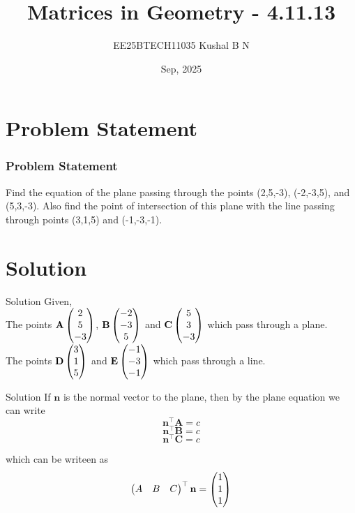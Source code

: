 \documentclass[notheorems]{beamer}
\title{Matrices in Geometry - 4.11.13}
\author{EE25BTECH11035  Kushal B N}
\date{Sep, 2025}
\let\vec\mathbf
\theoremstyle{remark}
\begin{document}
\maketitle

\section{Problem Statement}
\begin{frame}
\frametitle{Problem Statement}
Find the equation of the plane passing through the points (2,5,-3), (-2,-3,5), and (5,3,-3). Also find the point of intersection of this plane with the line passing through points (3,1,5) and (-1,-3,-1).
\end{frame}

\section{Solution}
\begin{frame}{Solution}
Given,\\
The points $\vec{A}\myvec{2\\5\\-3}$, $\vec{B}\myvec{-2\\-3\\5}$ and $\vec{C}\myvec{5\\3\\-3}$ which pass through a plane.\\
The points $\vec{D}\myvec{3\\1\\5}$ and $\vec{E}\myvec{-1\\-3\\-1}$ which pass through a line.
\end{frame}

\begin{frame}{Solution}
If $\vec{n}$ is the normal vector to the plane, then by the plane equation we can write\\
\begin{equation}
    \vec{n}^{\top}\vec{A} = c
\end{equation}
\begin{equation}
    \vec{n}^{\top}\vec{B} = c
\end{equation}
\begin{equation}
    \vec{n}^{\top}\vec{C} = c
\end{equation}

which can be writeen as
\begin{equation}
    \myvec{A&B&C}^{\top}\vec{n} = \myvec{1\\1\\1}
\end{equation}
\end{frame}
\end{document}
